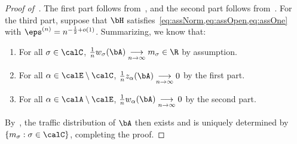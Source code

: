 \begin{proof}[Proof of~]
    The first part
    follows from~, and  the second part
    follows from~.
    For the third part, suppose that $\bH$ satisfies~\cref{eq:assNorm,eq:assOpen,eq:assOne} with $\eps^{(n)} = n^{-\frac 12 + o(1)}$. Summarizing, we know that:
    \begin{enumerate}
        \item For all $\sigma\in\calC$, $\frac 1n w_\sigma(\bA)\underset{n\to\infty}{\longrightarrow} m_\sigma\in \R$ by
        assumption.
        \item For all $\alpha\in\calE\setminus \calC$, $\frac 1n z_\alpha(\bA)\underset{n\to\infty}{\longrightarrow} 0$ by the first part.
        \item For all $\alpha\in\calA\setminus \calE$, $\frac 1n w_\alpha(\bA)\underset{n\to\infty}{\longrightarrow} 0$ by the second part.
    \end{enumerate}
    By~, the traffic distribution
    of $\bA$ then exists and is uniquely determined
    by $\{m_\sigma : \sigma\in \calC\}$, completing the proof.
\end{proof}
